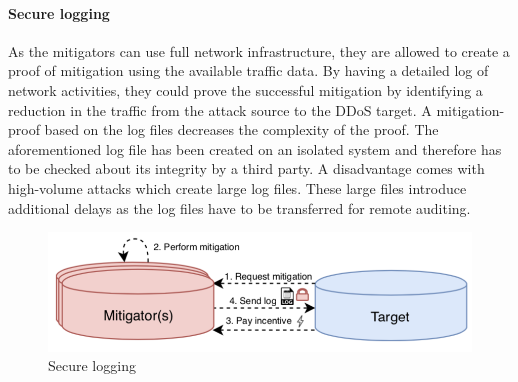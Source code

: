\paragraph{Secure logging}
As the mitigators can use full network infrastructure, they are allowed to create a proof of mitigation using the available traffic data. By having a detailed log of network activities, they could prove the successful mitigation by identifying a reduction in the traffic from the attack source to the DDoS target. A mitigation-proof based on the log files decreases the complexity of the proof. The aforementioned log file has been created on an isolated system and therefore has to be checked about its integrity by a third party. A disadvantage comes with high-volume attacks which create large log files. These large files introduce additional delays as the log files have to be transferred for remote auditing.
\begin{figure}[ht]
  \begin{center}
  \includegraphics[scale=0.5]{Talk7/img/ddos/cooperative_network_secure_logging}
  \end{center}
  \caption{Secure logging}
  \label{ddos_secure_logging}
\end{figure}

